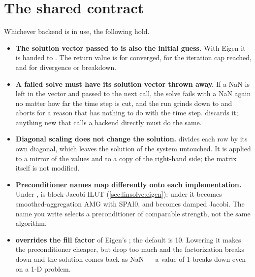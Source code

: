 \section{The shared contract}
\label{sec:linsolve:contract}

Whichever backend is in use, the following hold.

\begin{itemize}
  \item \textbf{The solution vector passed to  is also the
    initial guess.} With Eigen it is handed to . The
    return value is  for converged,  for the iteration cap
    reached, and  for divergence or breakdown.
  \item \textbf{A failed solve must have its solution vector thrown away.} If a
    NaN is left in the vector and passed to the next call, the solve fails with
    a NaN again no matter how far the time step is cut, and the run grinds down
    to  and aborts for a reason that has nothing to do with the time
    step.  discards it; anything new that
    calls a backend directly must do the same.
  \item \textbf{Diagonal scaling does not change the solution.}
     divides each row by its own diagonal, which leaves the
    solution of the system untouched. It is applied to a mirror of the values
    and to a copy of the right-hand side; the matrix itself is not modified.
  \item \textbf{Preconditioner names map differently onto each
    implementation.} Under ,  is block-Jacobi ILUT
    (\cref{sec:linsolve:eigen}); under  it becomes
    smoothed-aggregation AMG with SPAI0, and  becomes damped
    Jacobi. The name you write selects a preconditioner of comparable
    strength, not the same algorithm.
  \item \textbf{ overrides the fill factor} of Eigen's
    ; the default is 10. Lowering it makes the
    preconditioner cheaper, but drop too much and the factorization breaks down
    and the solution comes back as NaN --- a value of 1 breaks down even on a
    1-D problem.
\end{itemize}
